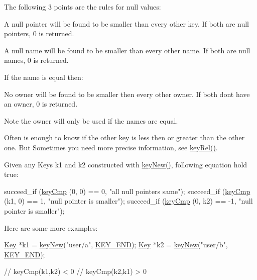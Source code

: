 The following 3 points are the rules for null values\+:


\begin{DoxyItemize}
\item A null pointer will be found to be smaller than every other key. If both are null pointers, 0 is returned.
\item A null name will be found to be smaller than every other name. If both are null names, 0 is returned.
\end{DoxyItemize}

If the name is equal then\+:


\begin{DoxyItemize}
\item No owner will be found to be smaller then every other owner. If both don\textquotesingle{}t have an owner, 0 is returned.
\end{DoxyItemize}

\begin{DoxyNote}{Note}
the owner will only be used if the names are equal.
\end{DoxyNote}
Often is enough to know if the other key is less then or greater than the other one. But Sometimes you need more precise information, see \hyperlink{group__keytest_ga6bb0f95ac34ce9c42d61bb35a76139d0}{key\+Rel()}.

Given any Keys k1 and k2 constructed with \hyperlink{group__key_gad23c65b44bf48d773759e1f9a4d43b89}{key\+New()}, following equation hold true\+:


\begin{DoxyCodeInclude}
        succeed\_if (\hyperlink{group__keytest_gaf6e66e12fe04d535a5d1c8218ced803e}{keyCmp} (0, 0) == 0, \textcolor{stringliteral}{"all null pointers same"});
        succeed\_if (\hyperlink{group__keytest_gaf6e66e12fe04d535a5d1c8218ced803e}{keyCmp} (k1, 0) == 1, \textcolor{stringliteral}{"null pointer is smaller"});
        succeed\_if (\hyperlink{group__keytest_gaf6e66e12fe04d535a5d1c8218ced803e}{keyCmp} (0, k2) == -1, \textcolor{stringliteral}{"null pointer is smaller"});
\end{DoxyCodeInclude}
 Here are some more examples\+: 
\begin{DoxyCode}
\hyperlink{classkdb_1_1Key_a5679f5cae63caddd64a60388b9cc77fa}{Key} *k1 = \hyperlink{group__key_gad23c65b44bf48d773759e1f9a4d43b89}{keyNew}(\textcolor{stringliteral}{"user/a"}, \hyperlink{group__key_gga91fb3178848bd682000958089abbaf40aa8adb6fcb92dec58fb19410eacfdd403}{KEY\_END});
\hyperlink{classkdb_1_1Key_a5679f5cae63caddd64a60388b9cc77fa}{Key} *k2 = \hyperlink{group__key_gad23c65b44bf48d773759e1f9a4d43b89}{keyNew}(\textcolor{stringliteral}{"user/b"}, \hyperlink{group__key_gga91fb3178848bd682000958089abbaf40aa8adb6fcb92dec58fb19410eacfdd403}{KEY\_END});

\textcolor{comment}{// keyCmp(k1,k2) < 0}
\textcolor{comment}{// keyCmp(k2,k1) > 0}
\end{DoxyCode}


